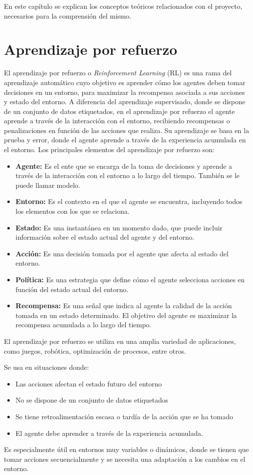 En este capítulo se explican los conceptos teóricos relacionados con el proyecto, necesarios para la comprensión del mismo.

\section{Aprendizaje por refuerzo}
El aprendizaje por refuerzo o \textit{Reinforcement Learning} (RL) es una rama del aprendizaje automático cuyo objetivo es aprender cómo los agentes deben tomar decisiones en un entorno, para maximizar la recompensa asociada a sus acciones y estado del entorno. A diferencia del aprendizaje supervisado, donde se dispone de un conjunto de datos etiquetados, en el aprendizaje por refuerzo el agente aprende a través de la interacción con el entorno, recibiendo recompensas o penalizaciones en función de las acciones que realiza. Su aprendizaje se basa en la prueba y error, donde el agente aprende a través de la experiencia acumulada en el entorno.
Los principales elementos del aprendizaje por refuerzo son:
\begin{itemize}
	\item \textbf{Agente:} Es el ente que se encarga de la toma de decisiones y aprende a través de la interacción con el entorno a lo largo del tiempo. También se le puede llamar modelo.
	\item \textbf{Entorno:} Es el contexto en el que el agente se encuentra, incluyendo todos los elementos con los que se relaciona.
	\item \textbf{Estado:} Es una instantánea en un momento dado, que puede incluir información sobre el estado actual del agente y del entorno.
	\item \textbf{Acción:} Es una decisión tomada por el agente que afecta al estado del entorno.
	\item \textbf{Política:} Es una estrategia que define cómo el agente selecciona acciones en función del estado actual del entorno.
	\item \textbf{Recompensa:} Es una señal que indica al agente la calidad de la acción tomada en un estado determinado. El objetivo del agente es maximizar la recompensa acumulada a lo largo del tiempo.
\end{itemize}

El aprendizaje por refuerzo se utiliza en una amplia variedad de aplicaciones, como juegos, robótica, optimización de procesos, entre otros.

Se usa en situaciones donde:
\begin{itemize}
	\item Las acciones afectan el estado futuro del entorno
	\item No se dispone de un conjunto de datos etiquetados
	\item Se tiene retroalimentación escasa o tardía de la acción que se ha tomado
	\item El agente debe aprender a través de la experiencia acumulada.
\end{itemize}
Es especialmente útil en entornos muy variables o dinámicos, donde se tienen que tomar acciones secuencialmente y se necesita una adaptación a los cambios en el entorno.



